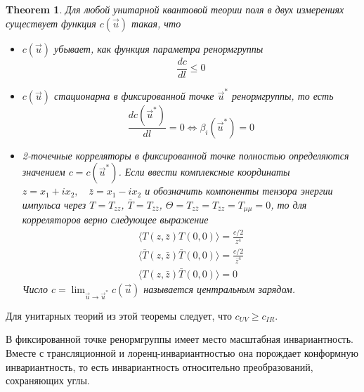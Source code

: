 \documentclass[a4paper,12pt]{article}
\newtheorem{theorem}{Theorem}
\theoremstyle{definition}
\theoremstyle{definition}
\theoremstyle{definition}
\begin{document}
\begin{theorem}
  Для любой унитарной квантовой теории поля в двух измерениях существует функция $c(\vec u)$ такая, что
  \begin{itemize}
  \item $c(\vec u)$ убывает, как функция параметра ренормгруппы
    \begin{equation}
      \label{eq:95}
      \frac{dc}{dl}\leq 0
    \end{equation}
  \item $c(\vec u)$ стационарна в фиксированной точке $\vec u^*$ ренормгруппы, то есть
    \begin{equation}
      \label{eq:96}
      \frac{dc({\vec u^*})}{dl}=0 \Leftrightarrow \beta_i(\vec u^*)=0
    \end{equation}
  \item 2-точечные корреляторы в фиксированной точке полностью определяются значением $c=c(\vec u^*)$.
    Если ввести комплексные координаты $z=x_1+ix_2,\quad \bar z=x_1-ix_2$ и обозначить компоненты тензора энергии импульса через $T=T_{zz}$, $\bar T=T_{\bar z\bar z}$, $\Theta=T_{z\bar z}=T_{\bar z z}=T_{\mu\mu}=0$, то для корреляторов верно следующее выражение
    \begin{eqnarray}
      \label{eq:97}
      \langle T(z,\bar z)T(0,0)\rangle=\frac{c/2}{z^4}\\
      \langle \bar T(z,\bar z)\bar T(0,0)\rangle=\frac{c/2}{\bar z^4}\\
      \langle T(z,\bar z) \bar T(0,0)\rangle=0
    \end{eqnarray}
    Число $c=\lim_{\vec u\to \vec u^*} c(\vec u)$ называется центральным зарядом. 
  \end{itemize}
\end{theorem}
Для унитарных теорий из этой теоремы следует, что $c_{UV}\geq c_{IR}$.

В фиксированной точке ренормгруппы имеет место масштабная инвариантность. Вместе с трансляционной и лоренц-инвариантностью она порождает конформную инвариантность, то есть инвариантность относительно преобразований, сохраняющих углы.
{}

\end{document}
